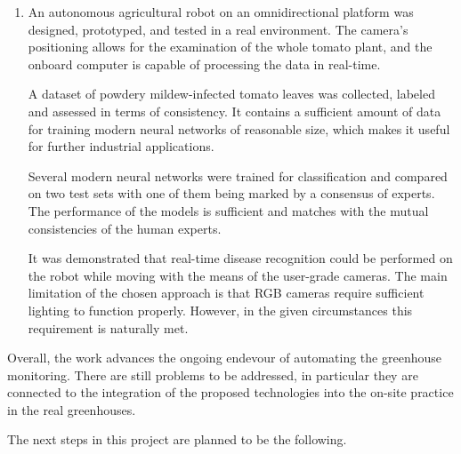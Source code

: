 \begin{enumerate}
The inference time of 290 milliseconds allows for the real-time onboard inference with limited computational resources.
The proposed approach can be used on mobile robots for the agricultural facilities monitoring.

\item An autonomous agricultural robot on an omnidirectional platform was designed, prototyped, and tested in a real environment.
The camera's positioning allows for the examination of the whole tomato plant, and the onboard computer is capable of processing the data in real-time.

A dataset of powdery mildew-infected tomato leaves was collected, labeled and assessed in terms of consistency. It contains a sufficient amount of data for training modern neural networks of reasonable size, which makes it useful for further industrial applications.

Several modern neural networks were trained for classification and compared on two test sets with one of them being marked by a consensus of experts.
The performance of the models is sufficient and matches with the mutual consistencies of the human experts.

It was demonstrated that real-time disease recognition could be performed on the robot while moving with the means of the user-grade cameras.
The main limitation of the chosen approach is that RGB cameras require sufficient lighting to function properly.
However, in the given circumstances this requirement is naturally met.

\end{enumerate}

Overall, the work advances the ongoing endevour of automating the greenhouse monitoring.
There are still problems to be addressed, in particular they are connected to the integration of the proposed technologies into the on-site practice in the real greenhouses.

The next steps in this project are planned to be the following.


